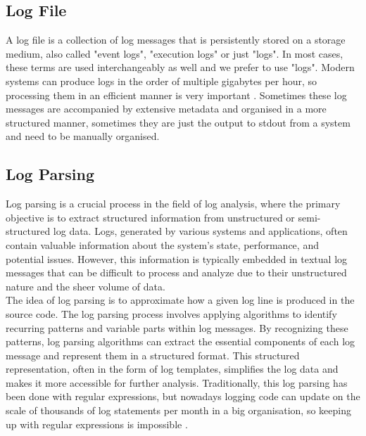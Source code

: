 \subsection{Log File}
\label{sec:Methods:Fundamentals:Logfile}

A log file is a collection of log messages that is persistently stored on a storage medium, also called "event logs", "execution logs" or just "logs". In most cases, these terms are used interchangeably as well and we prefer to use "logs". Modern systems can produce logs in the order of multiple gigabytes per hour, so processing them in an efficient manner is very important \cite{zhu2019tools}. Sometimes these log messages are accompanied by extensive metadata and organised in a more structured manner, sometimes they are just the output to stdout from a system and need to be manually organised. 

\subsection{Log Parsing}
\label{sec:Methods:Fundamentals:Parsing}

Log parsing is a crucial process in the field of log analysis, where the primary objective is to extract structured information from unstructured or semi-structured log data. Logs, generated by various systems and applications, often contain valuable information about the system's state, performance, and potential issues. However, this information is typically embedded in textual log messages that can be difficult to process and analyze due to their unstructured nature and the sheer volume of data.\\

The idea of log parsing is to approximate how a given log line is produced in the source code. The log parsing process involves applying algorithms to identify recurring patterns and variable parts within log messages. By recognizing these patterns, log parsing algorithms can extract the essential components of each log message and represent them in a structured format. This structured representation, often in the form of log templates, simplifies the log data and makes it more accessible for further analysis. Traditionally, this log parsing has been done with regular expressions, but nowadays logging code can update on the scale of thousands of log statements per month in a big organisation, so keeping up with regular expressions is impossible \cite{zhu2019tools}.\\

